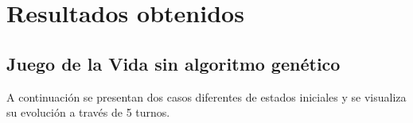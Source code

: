 \section{Resultados obtenidos}

\subsection{Juego de la Vida sin algoritmo genético}

A continuación se presentan dos casos diferentes de estados iniciales y se visualiza su 
evolución a través de 5 turnos.

